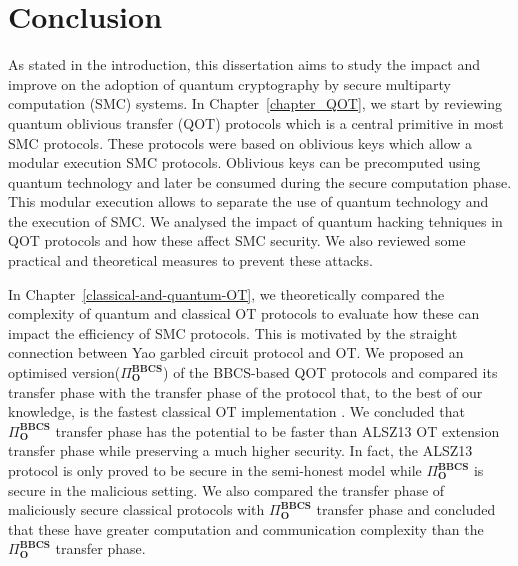 


%

\chapter{Conclusion}
\label{ch:conclusion}

As stated in the introduction, this dissertation aims to study the impact and improve on the adoption of quantum cryptography by secure multiparty computation (SMC) systems. In Chapter~\ref{chapter_QOT}, we start by reviewing quantum oblivious transfer (QOT) protocols which is a central primitive in most SMC protocols. These protocols were based on oblivious keys which allow a modular execution SMC protocols. Oblivious keys can be precomputed using quantum technology and later be consumed during the secure computation phase. This modular execution allows to separate the use of quantum technology and the execution of SMC. We analysed the impact of quantum hacking tehniques in QOT protocols and how these affect SMC security. We also reviewed some practical and theoretical measures to prevent these attacks.

In Chapter~\ref{classical-and-quantum-OT}, we theoretically compared the complexity of quantum and classical OT protocols to evaluate how these can impact the efficiency of SMC protocols. This is motivated by the straight connection between Yao garbled circuit protocol and OT. We proposed an optimised version($\Pi^{\textbf{BBCS}}_{\textbf{O}}$) of the BBCS-based QOT protocols and compared its transfer phase with the transfer phase of the protocol that, to the best of our knowledge, is the fastest classical OT implementation \cite{ALSZ13}. We concluded that $\Pi^{\textbf{BBCS}}_{\textbf{O}}$ transfer phase has the potential to be faster than ALSZ13 OT extension transfer phase while preserving a much higher security. In fact, the ALSZ13 protocol is only proved to be secure in the semi-honest model while $\Pi^{\textbf{BBCS}}_{\textbf{O}}$ is secure in the malicious setting. 
We also compared the transfer phase of maliciously secure classical protocols \cite{ALSZ15, KOS15} with $\Pi^{\textbf{BBCS}}_{\textbf{O}}$ transfer phase and concluded that these have greater computation and communication complexity than the $\Pi^{\textbf{BBCS}}_{\textbf{O}}$ transfer phase. 

